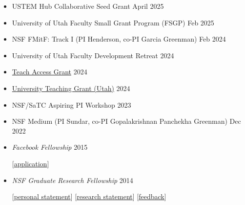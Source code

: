 \documentclass{article}
\begin{document}
\begin{itemize}
  \item USTEM Hub Collaborative Seed Grant \hfill April 2025
  \item University of Utah Faculty Small Grant Program (FSGP) \hfill Feb 2025
  \item NSF FMitF: Track I (PI Henderson, co-PI Garcia Greenman) \hfill Feb 2024
  \item University of Utah Faculty Development Retreat \hfill 2024
  \item \href{https://teachaccess.org/initiatives/grants/}{Teach Access Grant}  \hfill 2024
  \item \href{https://academic-affairs.utah.edu/awards-nominations/university-teaching-committee/university-teaching-grants/}{University Teaching Grant (Utah)} \hfill 2024
\item NSF/SaTC Aspiring PI Workshop \hfill 2023
\item NSF Medium (PI Sundar, co-PI Gopalakrishnan Panchekha Greenman) \hfill Dec 2022
\item \emph{Facebook Fellowship} \hfill 2015
\item[] [\href{http://cs.utah.edu/~blg/cv/failures/facebook-2015-reject.pdf}{application}]
\item \emph{NSF Graduate Research Fellowship} \hfill 2014
\item[] [\href{https://cs.utah.edu/~blg/cv/failures/nsf-2014-personal-reject.pdf}{personal statement}]
        [\href{https://cs.utah.edu/~blg/cv/failures/nsf-2014-research-reject.pdf}{research statement}]
        [\href{https://cs.utah.edu/~blg/cv/failures/nsf-2014-reject-response.pdf}{feedback}]
\end{itemize}


\end{document}
